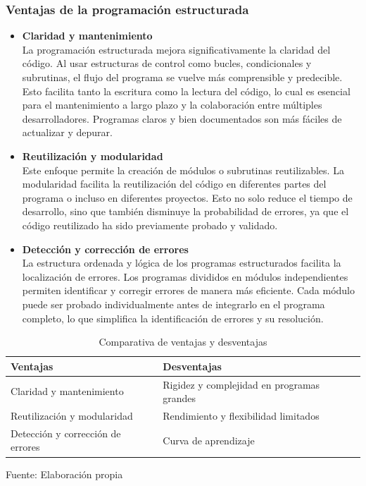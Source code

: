 \subsubsection{Ventajas de la programación estructurada}
\begin{itemize}
  \item \textbf{Claridad y mantenimiento} \\
  La programación estructurada mejora significativamente la claridad del código. Al usar estructuras de control como bucles, condicionales y subrutinas, el flujo del programa se vuelve más comprensible y predecible. Esto facilita tanto la escritura como la lectura del código, lo cual es esencial para el mantenimiento a largo plazo y la colaboración entre múltiples desarrolladores. Programas claros y bien documentados son más fáciles de actualizar y depurar. \parencite{Dijkstra1968}

  \item \textbf{Reutilización y modularidad} \\
  Este enfoque permite la creación de módulos o subrutinas reutilizables. La modularidad facilita la reutilización del código en diferentes partes del programa o incluso en diferentes proyectos. Esto no solo reduce el tiempo de desarrollo, sino que también disminuye la probabilidad de errores, ya que el código reutilizado ha sido previamente probado y validado. \parencite{Dijkstra1968}

  \item \textbf{Detección y corrección de errores} \\
  La estructura ordenada y lógica de los programas estructurados facilita la localización de errores. Los programas divididos en módulos independientes permiten identificar y corregir errores de manera más eficiente. Cada módulo puede ser probado individualmente antes de integrarlo en el programa completo, lo que simplifica la identificación de errores y su resolución. \parencite{Dijkstra1968}
\end{itemize}

\begin{table}[!h]
  \begin{center}
    \begin{tabularx}{0.8\textwidth}{|X|X|}
      \hline
      \textbf{Ventajas} & \textbf{Desventajas} \\
      \hline
      Claridad y mantenimiento & Rigidez y complejidad en programas grandes \\
      \hline
      Reutilización y modularidad & Rendimiento y flexibilidad limitados \\
      \hline
      Detección y corrección de errores & Curva de aprendizaje \\
      \hline
    \end{tabularx}
  \end{center}
  \caption{Comparativa de ventajas y desventajas}
  \centering Fuente: Elaboración propia
  \label{tab:ventajas}
\end{table}

